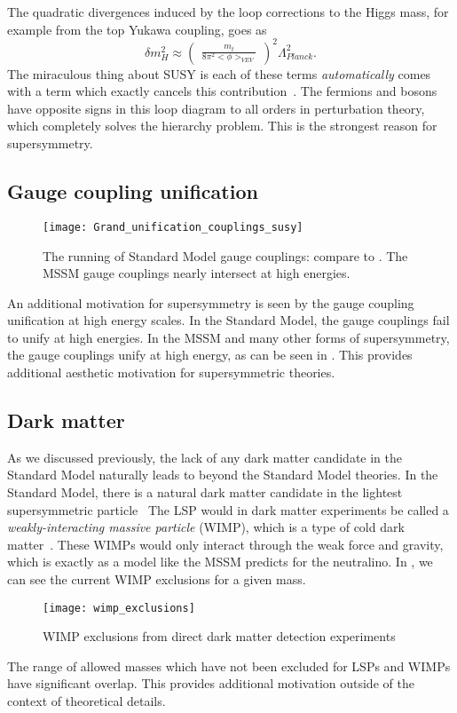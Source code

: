 The quadratic divergences induced by the loop corrections to the Higgs mass, for example from the top Yukawa coupling, goes as
\begin{equation}
\delta m^2_H \approx \begin{pmatrix} \frac{m_t}{8\pi^2 <\phi>_{VEV}} \end{pmatrix}^2 \Lambda_{Planck}^2.
\end{equation}
The miraculous thing about SUSY is each of these terms \textit{automatically} comes with a term which exactly cancels this contribution~\cite{susyPrimer}.
The fermions and bosons have opposite signs in this loop diagram to all orders in perturbation theory, which completely solves the hierarchy problem.
This is the strongest reason for supersymmetry.

\subsection{Gauge coupling unification}
\begin{figure}[tbp]
\caption{The running of Standard Model gauge couplings: compare to .  The MSSM gauge couplings nearly intersect at high energies.}\label{fig:susy_gauge_coupling}
\texttt{[image: Grand\_unification\_couplings\_susy]}
\end{figure}

An additional motivation for supersymmetry is seen by the gauge coupling unification at high energy scales.
In the Standard Model, the gauge couplings fail to unify at high energies.
In the MSSM and many other forms of supersymmetry, the gauge couplings unify at high energy, as can be seen in .
This provides additional aesthetic motivation for supersymmetric theories.

\subsection{Dark matter}

As we discussed previously, the lack of any dark matter candidate in the Standard Model naturally leads to beyond the Standard Model theories.
In the Standard Model, there is a natural dark matter candidate in the lightest supersymmetric particle~\cite{susyPrimer}
The LSP would in dark matter experiments be called a  \textit{weakly-interacting massive particle} (WIMP), which is a type of cold dark matter~\cite{darkMatterPrimer,Klasen:2015uma}.
These WIMPs would only interact through the weak force and gravity, which is exactly as a model like the MSSM predicts for the neutralino.
In , we can see the current WIMP exclusions for a given mass.
\begin{figure}[tbp]
\caption{WIMP exclusions from direct dark matter detection experiments}\label{fig:wimp_exclusions}
\texttt{[image: wimp\_exclusions]}
\end{figure}
The range of allowed masses which have not been excluded for LSPs and WIMPs have significant overlap.
This provides additional motivation outside of the context of theoretical details.

